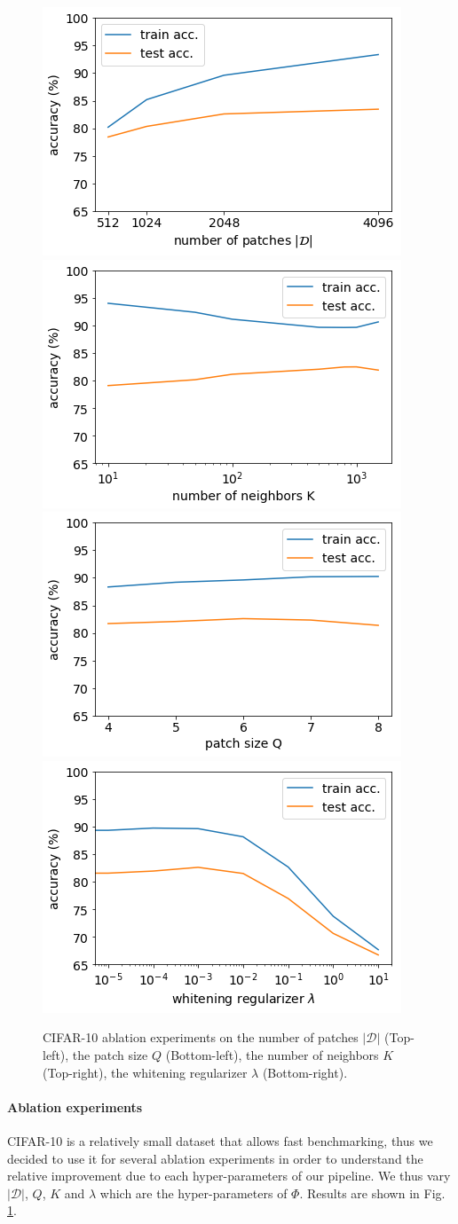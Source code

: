 \documentclass{article}
\begin{document}
\begin{figure} 
  \label{fig:ablation_study}
  \centering
   \includegraphics[width=0.43\linewidth]{figures/albation_study_npatches.png}
  \includegraphics[width=0.43\linewidth]{figures/albation_study_K.png}
  \includegraphics[width=0.43\linewidth]{figures/albation_study_Q.png}
  \includegraphics[width=0.43\linewidth]{figures/albation_study_lambda.png}\\
  \caption{CIFAR-10 ablation experiments on the number of patches  $|\mathcal{D}|$ (Top-left), the patch size $Q$ (Bottom-left), the number of neighbors $K$ (Top-right), the whitening regularizer $\lambda$ (Bottom-right).}
\end{figure}




\paragraph{Ablation experiments}
CIFAR-10 is a relatively small dataset that allows fast benchmarking, thus we decided to use it for several ablation experiments in order to understand the relative improvement due to each hyper-parameters of our pipeline. We thus vary $|\mathcal{D}|$, $Q$, $K$ and $\lambda$ which are the hyper-parameters of $\Phi$. Results are shown in Fig. \ref{fig:ablation_study}.
\end{document}
